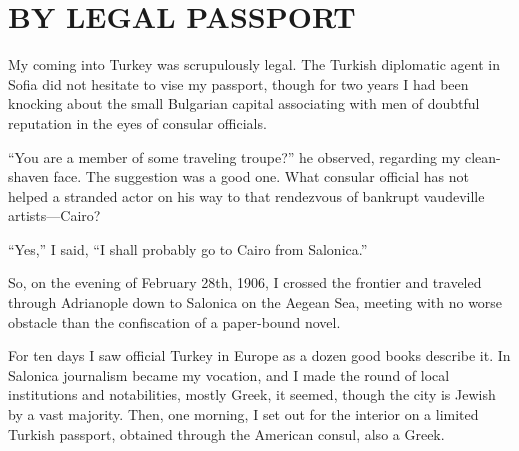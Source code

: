 \documentclass[a5paper,12pt]{book}
\begin{document}
%
%


\chapter{BY LEGAL PASSPORT}
\pagestyle{plain} %

My coming into Turkey was scrupulously legal. The Turkish diplomatic agent in Sofia did not hesitate to vise my passport, though for two years I had been knocking about the small Bulgarian capital associating with men of doubtful reputation in the eyes of consular officials.

“You are a member of some traveling troupe?” he observed, regarding my clean-shaven face. The suggestion was a good one. What consular official has not helped a stranded actor on his way to that rendezvous of bankrupt vaudeville artists—Cairo?

“Yes,” I said, “I shall probably go to Cairo from Salonica.”

So, on the evening of February 28th, 1906, I crossed the frontier and traveled through Adrianople down to Salonica on the Aegean Sea, meeting with no worse obstacle than the confiscation of a paper-bound novel.

For ten days I saw official Turkey in Europe as a dozen good books describe it. In Salonica journalism became my vocation, and I made the round of local institutions and notabilities, mostly Greek, it seemed, though the city is Jewish by a vast majority. Then, one morning, I set out for the interior on a limited Turkish passport, obtained through the American consul, also a Greek.
\end{document}
